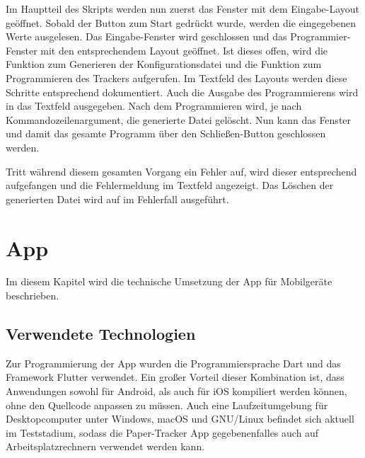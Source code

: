 Im Hauptteil des Skripts werden nun zuerst das Fenster mit dem Eingabe-Layout geöffnet.
Sobald der Button zum Start gedrückt wurde, werden die eingegebenen Werte ausgelesen.
Das Eingabe-Fenster wird geschlossen und das Programmier-Fenster mit den entsprechendem Layout geöffnet.
Ist dieses offen, wird die Funktion zum Generieren der Konfigurationsdatei und die Funktion zum Programmieren des Trackers aufgerufen.
Im Textfeld des Layouts werden diese Schritte entsprechend dokumentiert.
Auch die Ausgabe des Programmierens wird in das Textfeld ausgegeben.
Nach dem Programmieren wird, je nach Kommandozeilenargument, die generierte Datei gelöscht.
Nun kann das Fenster und damit das gesamte Programm über den Schließen-Button geschlossen werden.

Tritt während diesem gesamten Vorgang ein Fehler auf, wird dieser entsprechend aufgefangen und die Fehlermeldung im Textfeld angezeigt.
Das Löschen der generierten Datei wird auf im Fehlerfall ausgeführt.

\section{App}

Im diesem Kapitel wird die technische Umsetzung der App für Mobilgeräte beschrieben.

\subsection{Verwendete Technologien}

Zur Programmierung der App wurden die Programmiersprache Dart und das Framework Flutter verwendet.
Ein großer Vorteil dieser Kombination ist, dass Anwendungen sowohl für Android, als auch für iOS
kompiliert werden können, ohne den Quellcode anpassen zu müssen. Auch eine Laufzeitumgebung für
Desktopcomputer unter Windows, macOS und GNU/Linux befindet sich aktuell im Teststadium, sodass die
Paper-Tracker App gegebenenfalles auch auf Arbeitsplatzrechnern verwendet werden kann.

